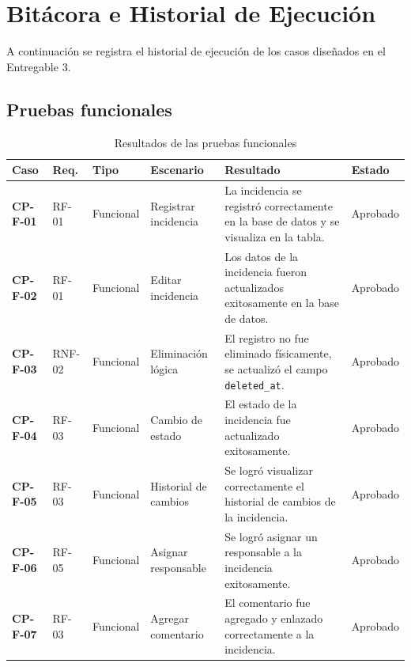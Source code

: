 \section{Bitácora e Historial de Ejecución}

\label{subsec:bitacora_ejecucion}

A continuación se registra el historial de ejecución de los casos diseñados en el Entregable 3.

\subsection{Pruebas funcionales}
\begin{xltabular}{\textwidth}{X X X X X X}

    \caption{Resultados de las pruebas funcionales}
    \label{tab:pruebas_funcionales} \\
        \toprule
        \textbf{Caso} & \textbf{Req.} & \textbf{Tipo} & \textbf{Escenario} & \textbf{Resultado} & \textbf{Estado} \\
        \midrule
        \textbf{CP-F-01} & RF-01 & Funcional & Registrar incidencia & La incidencia se registró correctamente en la base de datos y se visualiza en la tabla. & Aprobado \\
        \textbf{CP-F-02} & RF-01 & Funcional & Editar incidencia & Los datos de la incidencia fueron actualizados exitosamente en la base de datos. & Aprobado \\
        \textbf{CP-F-03} & RNF-02 & Funcional & Eliminación lógica & El registro no fue eliminado físicamente, se actualizó el campo \texttt{deleted\_at}. & Aprobado \\
        \textbf{CP-F-04} & RF-03 & Funcional & Cambio de estado & El estado de la incidencia fue actualizado exitosamente. & Aprobado \\
        \textbf{CP-F-05} & RF-03 & Funcional & Historial de cambios & Se logró visualizar correctamente el historial de cambios de la incidencia. & Aprobado \\
        \textbf{CP-F-06} & RF-05 & Funcional & Asignar responsable & Se logró asignar un responsable a la incidencia exitosamente. & Aprobado \\
        \textbf{CP-F-07} & RF-03 & Funcional & Agregar comentario & El comentario fue agregado y enlazado correctamente a la incidencia. & Aprobado \\

\end{xltabular}
